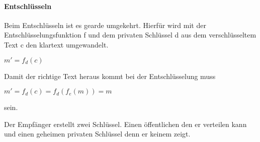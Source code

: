 \paragraph{Entschlüsseln}
Beim Entschlüsseln ist es gearde umgekehrt. Hierfür wird mit der Entschlüsselungsfunktion f und dem privaten Schlüssel d aus dem verschlüsseltem Text c den klartext umgewandelt.
\begin{center}
$ m' = f_d (c) $
\end{center}
Damit der richtige Text heraus kommt bei der Entschlüsselung muss 
\begin{center}
$ m' = f_d (c) = f_d(f_e(m))  = m$
\end{center}
sein.


Der Empfänger erstellt zwei Schlüssel. Einen öffentlichen den er verteilen kann und einen geheimen privaten Schlüssel denn er keinem zeigt. 

